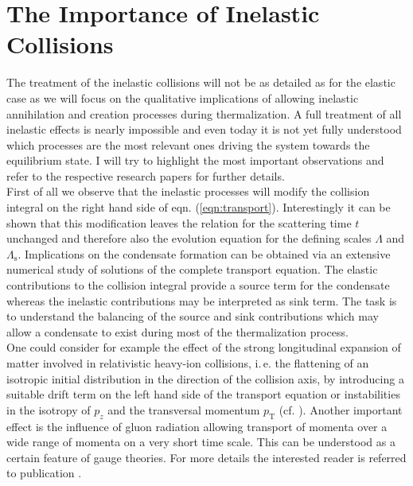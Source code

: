 \section{The Importance of Inelastic Collisions}
The treatment of the inelastic collisions will not be as detailed as for the elastic case as we will focus on the qualitative implications of allowing inelastic annihilation and creation processes during thermalization. A full treatment of all inelastic effects is nearly impossible and even today it is not yet fully understood which processes are the most relevant ones driving the system towards the equilibrium state. I will try to highlight the most important observations and refer to the respective research papers for further details. \\
\noindent 
First of all we observe that the inelastic processes will modify the collision integral on the right hand side of eqn. (\ref{eqn:transport}). Interestingly it can be shown that this modification leaves the relation for the scattering time $t$ unchanged and therefore also the evolution equation for the defining scales $\Lambda$ and $\Lambda_{\mathrm{s}}$. Implications on the condensate formation can be obtained via an extensive numerical study of solutions of the complete transport equation. The elastic contributions to the collision integral provide a source term for the condensate whereas the inelastic contributions may be interpreted as sink term. The task is to understand the balancing of the source and sink contributions which may allow a condensate to exist during most of the thermalization process.\\
\noindent
One could consider for example the effect of the strong longitudinal expansion of matter involved in relativistic heavy-ion collisions, i.\,e. the flattening of an isotropic initial distribution in the direction of the collision axis, by introducing a suitable drift term on the left hand side of the transport equation  or instabilities in the isotropy of $p_z$ and the transversal momentum $p_{\mathrm{T}}$ (cf. \cite{Blaizot2012}). Another important effect is the influence of gluon radiation allowing transport of momenta over a wide range of momenta on a very short time scale. This can be understood as a certain feature of gauge theories. For more details the interested reader is referred to publication \cite{Blaizot2016}.